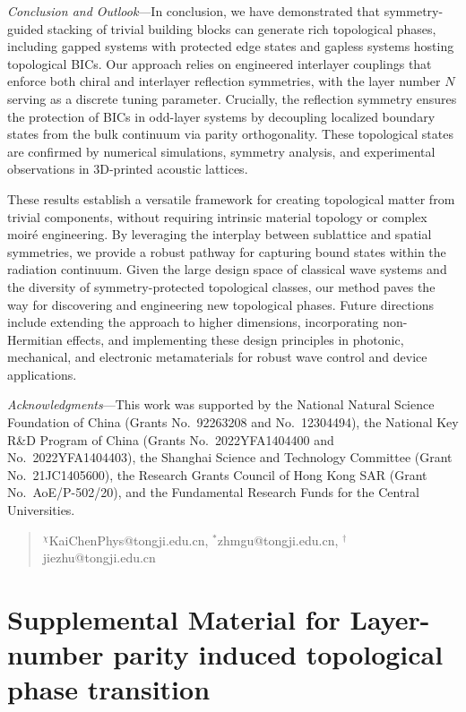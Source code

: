 \documentclass[twocolumn,english,prl,epsfig,rotate,showpacs,aps, superscriptaddress]{revtex4-2}
\begin{document}
\textit{Conclusion and Outlook}---In conclusion, we have demonstrated that symmetry-guided stacking of trivial building blocks can generate rich topological phases, including gapped systems with protected edge states and gapless systems hosting topological BICs. Our approach relies on engineered interlayer couplings that enforce both chiral and interlayer reflection symmetries, with the layer number $N$ serving as a discrete tuning parameter. Crucially, the reflection symmetry ensures the protection of BICs in odd-layer systems by decoupling localized boundary states from the bulk continuum via parity orthogonality. These topological states are confirmed by numerical simulations, symmetry analysis, and experimental observations in 3D-printed acoustic lattices.

These results establish a versatile framework for creating topological matter from trivial components, without requiring intrinsic material topology or complex moir\'e engineering. By leveraging the interplay between sublattice and spatial symmetries, we provide a robust pathway for capturing bound states within the radiation continuum. Given the large design space of classical wave systems and the diversity of symmetry-protected topological classes, our method paves the way for discovering and engineering new topological phases. Future directions include extending the approach to higher dimensions, incorporating non-Hermitian effects, and implementing these design principles in photonic, mechanical, and electronic metamaterials for robust wave control and device applications.

\textit{Acknowledgments}---This work was supported by the National Natural Science Foundation of China (Grants No.~92263208 and No.~12304494), the National Key R\&D Program of China (Grants No.~2022YFA1404400 and No.~2022YFA1404403), the Shanghai Science and Technology Committee (Grant No.~21JC1405600), the Research Grants Council of Hong Kong SAR (Grant No.~AoE/P-502/20), and the Fundamental Research Funds for the Central Universities.

\begin{quote}
$^{\chi}$KaiChenPhys@tongji.edu.cn,
$^{*}$zhmgu@tongji.edu.cn,
$^{\dagger}$jiezhu@tongji.edu.cn
\end{quote}

 

 \onecolumngrid


\section*{Supplemental Material for Layer-number parity induced topological phase transition}
\appendix
\end{document}
